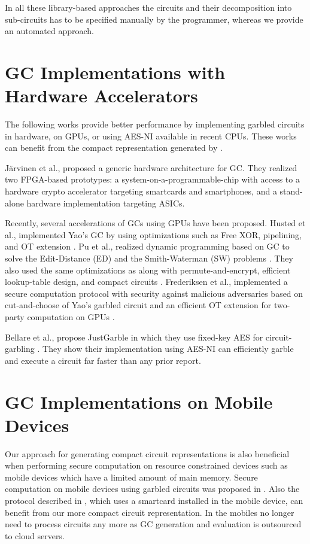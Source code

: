 In all these library-based approaches the circuits and their decomposition into sub-circuits has to be specified manually by the programmer, whereas we provide an automated approach.

\section{GC Implementations with Hardware Accelerators}\label{sec:HWaccel}
The following works provide better performance by implementing garbled circuits in hardware, on GPUs, or using AES-NI available in recent CPUs.
These works can benefit from the compact representation generated by \sys.

J\"arvinen et al., \cite{jarvinen2010garbled} proposed a generic hardware architecture for GC.
They realized two FPGA-based prototypes: a system-on-a-programmable-chip with access to a hardware crypto accelerator targeting smartcards and smartphones, and a stand-alone hardware implementation targeting ASICs.

Recently, several accelerations of GCs using GPUs have been proposed.
Husted et al., implemented Yao's GC by using optimizations such as Free XOR, pipelining, and OT extension \cite{husted2013gpu}.
Pu et al., realized dynamic programming based on GC to solve the Edit-Distance (ED) and the Smith-Waterman (SW) problems \cite{pu2013computing}.
They also used the same optimizations as \cite{husted2013gpu} along with permute-and-encrypt, efficient lookup-table design, and compact circuits \cite{pu2013computing}.
Frederiksen et al., implemented a secure computation protocol with security against malicious adversaries based on cut-and-choose of Yao's garbled circuit and an efficient OT extension for two-party computation on GPUs \cite{frederiksen2013fast}.

Bellare et al., propose JustGarble in which they use fixed-key AES for circuit-garbling \cite{bellare2013efficient}.
They show their implementation using AES-NI can efficiently garble and execute a circuit far faster than any prior report.

\section{GC Implementations on Mobile Devices}\label{sec:mobile}
Our approach for generating compact circuit representations is also beneficial when performing secure computation on resource constrained devices such as mobile devices which have a limited amount of main memory.
Secure computation on mobile devices using garbled circuits was proposed in \cite{HCE11}.
Also the protocol described in \cite{DSZ14}, which uses a smartcard installed in the mobile device, can benefit from our more compact circuit representation.
In \cite{CMTB13, CLT14} the mobiles no longer need to process circuits any more as GC generation and evaluation is outsourced to cloud servers.
